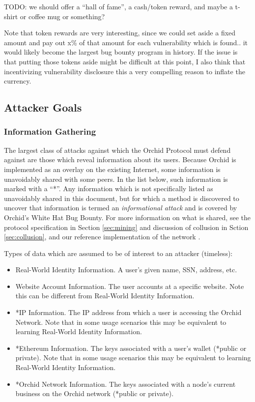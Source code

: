 \documentclass{article}
\newcommand{\mesh}{Orchid}
\begin{document}
TODO: we should offer a “hall of fame”, a cash/token reward, and maybe a t-shirt or coffee mug or something?

Note that token rewards are very interesting, since we could set aside a fixed amount and pay out x\% of that amount for each vulnerability which is found.. it would likely become the largest bug bounty program in history. If the issue is that putting those tokens aside might be difficult at this point, I also think that incentivizing vulnerability disclosure this a very compelling reason to inflate the currency.

\subsection{Attacker Goals}

\subsubsection{Information Gathering}

The largest class of attacks against which the \mesh{} Protocol must defend against are those which reveal information about its users. Because \mesh{} is implemented as an overlay on the existing Internet, some information is unavoidably shared with some peers. In the list below, such information is marked with a “*”. Any information which is not specifically listed as unavoidably shared in this document, but for which a method is discovered to uncover that information is termed an \emph{informational attack} and is covered by \mesh{}’s White Hat Bug Bounty. For more information on what is shared, see the protocol specification in Section \ref{sec:mining} and discussion of collusion in Sction \ref{sec:collusion}, and our reference implementation of the network \cite{oursoftware}.

Types of data which are assumed to be of interest to an attacker (timeless):

\begin{itemize}
\item Real-World Identity Information. A user’s given name, SSN, address, etc.
\item Website Account Information. The user accounts at a specific website. Note this can be different from Real-World Identity Information.
\item *IP Information. The IP address from which a user is accessing the \mesh{} Network. Note that in some usage scenarios this may be equivalent to learning Real-World Identity Information.
\item *Ethereum Information. The keys associated with a user’s wallet (*public or private). Note that in some usage scenarios this may be equivalent to learning Real-World Identity Information.
\item *\mesh{} Network Information. The keys associated with a node’s current business on the \mesh{} network (*public or private).
\end{itemize}
\end{document}
